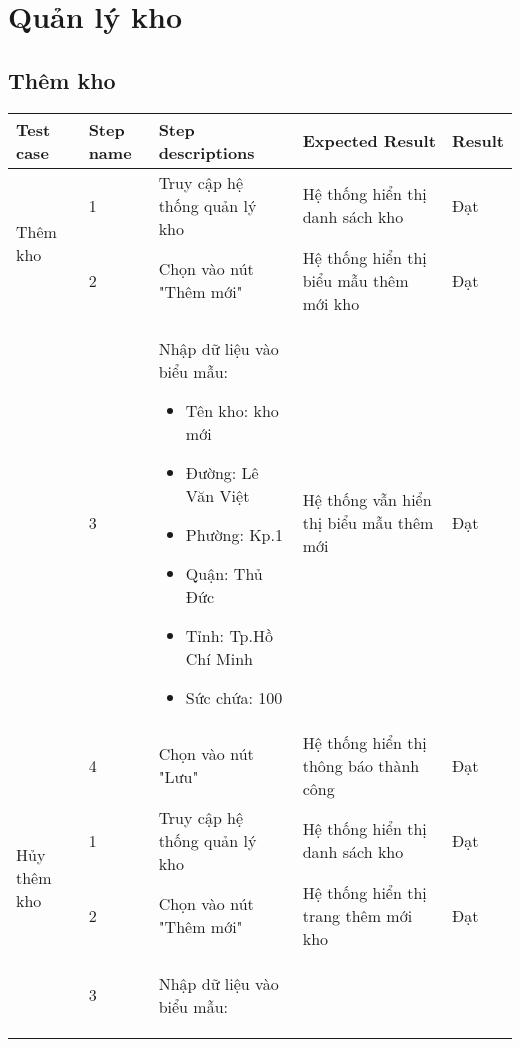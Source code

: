 
\section{Quản lý kho}
\subsection{Thêm kho}
{
    \setlength\extrarowheight{6pt}
    \begin{longtable}{| p{2.5cm}| p{1cm}| p{5.5cm}| p{4.5cm} | p{1.5cm} |}
        \hline
        \textbf{Test case} & \textbf{Step name} & \textbf{Step descriptions} & \textbf{Expected Result} & \textbf{Result} \\
        \hline
        \multirow[t]{2}{2.5cm}{Thêm kho} & 1 & Truy cập hệ thống quản lý kho & Hệ thống hiển thị danh sách kho & Đạt \\
        \cline{2-5}
         & 2 & Chọn vào nút "Thêm mới" & Hệ thống hiển thị biểu mẫu thêm mới kho & Đạt \\
        \cline{2-5}
        & 3 & Nhập dữ liệu vào biểu mẫu:
        \begin{itemize}
            \item Tên kho: kho mới
            \item Đường: Lê Văn Việt
            \item Phường: Kp.1
            \item Quận: Thủ Đức 
            \item Tỉnh: Tp.Hồ Chí Minh
            \item Sức chứa: 100
        \end{itemize} & Hệ thống vẫn hiển thị biểu mẫu thêm mới & Đạt \\
        \cline{2-5}
         & 4 & Chọn vào nút "Lưu" & Hệ thống hiển thị thông báo thành công & Đạt \\
        \hline
        \multirow[t]{2}{2.5cm}{Hủy thêm kho} & 1 & Truy cập hệ thống quản lý kho & Hệ thống hiển thị danh sách kho & Đạt \\
        \cline{2-5}
         & 2 & Chọn vào nút "Thêm mới" & Hệ thống hiển thị trang thêm mới kho & Đạt \\
        \cline{2-5}
        & 3 & Nhập dữ liệu vào biểu mẫu:
        \begin{itemize}

\end{itemize}
\end{longtable}}
